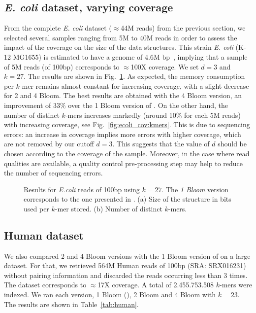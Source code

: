 \documentclass[pdftex]{llncs}\usepackage[T1]{fontenc}
\begin{document}
\subsection{\emph{E. coli} dataset, varying coverage} \label{subsec:cov}
From the complete \emph{E. coli} dataset ($\approx$44M reads) from
the previous section, we selected several samples ranging from 5M to 40M
reads in order to assess the impact of the coverage on the size of the
data structures. This strain \emph{E. coli} (K-12 MG1655) is estimated to
have a genome of 4.6M bp~\cite{ecoli}, implying that a sample of 5M
reads (of 100bp) corresponds to $\approx$100X coverage. We
set $d = 3$ and $k = 27$. The results are shown in
Fig.~\ref{fig:ecoli_coverage}. As expected, the 
memory consumption per $k$-mer
remains almost constant for increasing 
coverage, with a slight decrease for 2 and 4 Bloom. The best
results are obtained with the 4 Bloom version, an improvement of 33\%
over the 1 Bloom version of \cite{DBLP:conf/wabi/ChikhiR12}. On the other hand, the number of distinct $k$-mers 
increases markedly (around 10\% for each 5M reads) with increasing coverage, see Fig.~\ref{fig:ecoli_cov:kmers}. 
This is due to
sequencing errors: an increase in coverage implies more errors with
higher coverage, which are not removed by our cutoff
$d = 3$. This suggests that the value of $d$ should be chosen
according to the coverage of the sample. Moreover, in the case where
read qualities are available, a quality control pre-processing step may
help to reduce the number of sequencing errors.

\begin{figure}[Htbp]
  \center 
  \caption{Results for \emph{E.coli} reads of 100bp using $k =
    27$. The \emph{1 Bloom} version corresponds to the one presented
    in \cite{DBLP:conf/wabi/ChikhiR12}. (a) Size of the structure in
    bits used per $k$-mer stored. (b) Number of distinct $k$-mers.}\label{fig:ecoli_coverage}
\end{figure}

\subsection{Human dataset}
\label{human}
We also compared 2 and 4 Bloom versions with the 1 Bloom version of
\cite{DBLP:conf/wabi/ChikhiR12} on a large dataset. For that, we
retrieved 564M Human reads of 100bp (SRA: SRX016231) without pairing
information and
discarded the reads occurring less than 3 times.  The dataset
corresponds to $\approx$17X coverage. A total of 2.455.753.508
$k$-mers were indexed. We ran each version, 1 Bloom
(\cite{DBLP:conf/wabi/ChikhiR12}), 2 Bloom and 4 Bloom with $k =
23$. The results are shown in Table~\ref{tab:human}.
\end{document}
